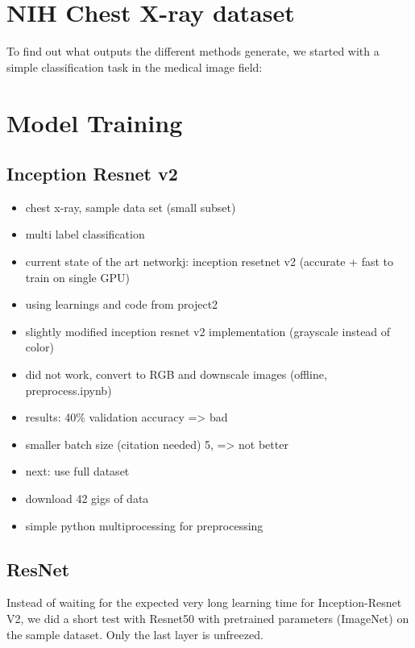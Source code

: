 \section{NIH Chest X-ray dataset}
To find out what outputs the different methods generate, we started with a simple classification task in the medical image field:

\section{Model Training}







\subsection{Inception Resnet v2}
\begin{itemize}
    \item  chest x-ray, sample data set (small subset)
    \item  multi label classification
    \item  current state of the art networkj: inception  resetnet v2 (accurate + fast to train on single GPU) \cite{todo}
    \item  using learnings and code from project2
    \item  slightly modified inception resnet v2 implementation (grayscale instead of color)
    \item  did not work, convert to RGB and downscale images (offline, preprocess.ipynb)
    \item  results: 40\% validation accuracy => bad
    \item smaller batch size (citation needed) 5, => not better
    \item next: use full dataset
    \item download 42 gigs of data
    \item simple python multiprocessing for preprocessing
\end{itemize}

\subsection{ResNet}
Instead of waiting for the expected very long learning time for Inception-Resnet V2, we did a short test with Resnet50 with pretrained parameters (ImageNet) on the sample dataset. Only the last layer is unfreezed.

